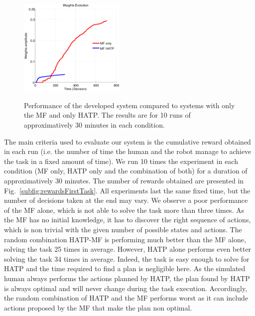 \documentclass[english,a4paper,11pt,twoside]{StyleThese}
\begin{document}
\begin{figure}[!h]
{        \centering
        \includegraphics[width=0.45\textwidth]{figs/Chapter7/WeightEvolFirstTask.pdf}
       \label{subfig:weightsFirstTask}
   }
    \caption{Performance of the developed system compared to systems with only the MF and only HATP. The results are for 10 runs of approximatively 30 minutes in each condition.}
    \label{fig:resultsFirstTask}
\end{figure}

The main criteria used to evaluate our system is the cumulative reward obtained in each run (i.e. the number of time the human and the robot manage to achieve the task in a fixed amount of time). We run 10 times the experiment in each condition (MF only, HATP only and the combination of both) for a duration of approximatively 30 minutes. The number of rewards obtained are presented in Fig.~\ref{subfig:rewardsFirstTask}. All experiments last the same fixed time, but the number of decisions taken at the end may vary.  We observe a poor performance of the MF alone, which is not able to solve the task more than three times. As the MF has no initial knowledge, it has to discover the right sequence of actions, which is non trivial with the given number of possible states and actions.
The random combination HATP-MF is performing much better than the MF alone, solving the task 25 times in average. However, HATP alone performs even better solving the task 34 times in average. Indeed, the task is easy enough to solve for HATP and the time required to find a plan is negligible here. As the simulated human always performs the actions planned by HATP, the plan found by HATP is always optimal and will never change during the task execution. Accordingly, the random combination of HATP and the MF performs worst as it can include actions proposed by the MF that make the plan non optimal.
\end{document}
